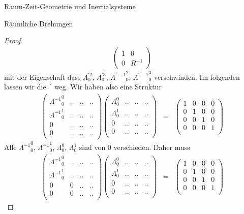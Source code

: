 \begin{chapter}{\titlestr}
\begin{section}{Raum-Zeit-Geometrie und Inertialsysteme}
\begin{subsection}{Räumliche Drehungen}
\begin{proof}
\begin{eqnarray*}
\begin{pmatrix}
1 & 0\\
0 & R^{-1}
\end{pmatrix}
\end{eqnarray*}
mit der Eigenschaft dass $\Lambda^{\prime 2}_0$, $\Lambda^{\prime 3}_0$, ${\Lambda^{\prime-1}}^2_0$, ${\Lambda^{\prime-1}}^3_0$ verschwinden. Im folgenden lassen wir die $\ ^\prime$ weg. Wir haben also eine Struktur
\begin{eqnarray*}
\begin{pmatrix}
{\Lambda^{-1}}^0_0 &..&..&..\\
{\Lambda^{-1}}^1_0 &..&..&..\\
0&..&..&..\\
0&..&..&..\\
\end{pmatrix}
\begin{pmatrix}
\Lambda^0_0 &..&..&..\\
\Lambda^1_0 &..&..&..\\
0&..&..&..\\
0&..&..&..\\
\end{pmatrix}
&=&
\begin{pmatrix}
1 &0&0&0\\
0&1&0&0\\
0&0&1&0\\
0&0&0&1\\
\end{pmatrix}
\end{eqnarray*}
Alle ${\Lambda^{-1}}^0_0$, ${\Lambda^{-1}}^1_0$, $\Lambda^0_0$, $\Lambda^1_0$ sind von 0 verschieden.
Daher muss
\begin{eqnarray*}
\begin{pmatrix}
{\Lambda^{-1}}^0_0 &..&..&..\\
{\Lambda^{-1}}^1_0 &..&..&..\\
0&0&..&..\\
0&0&..&..\\
\end{pmatrix}
\begin{pmatrix}
\Lambda^0_0 &..&..&..\\
\Lambda^1_0 &..&..&..\\
0&..&..&..\\
0&..&..&..\\
\end{pmatrix}
&=&
\begin{pmatrix}
1 &0&0&0\\
0&1&0&0\\
0&0&1&0\\
0&0&0&1\\

\end{pmatrix}
\end{eqnarray*}
\end{proof}
\end{subsection}
\end{section}
\end{chapter}
